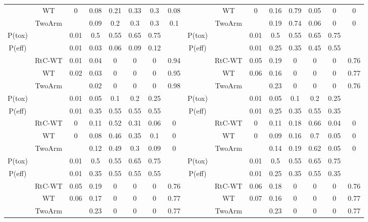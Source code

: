 \begin{table}
{\begin{tabular}[t]{ccccccc>{}c|cccccccc}
 			& WT & 0 & 0.08 & 0.21 & 0.33 & 0.3 & 0.08 &  & WT & 0 & 0.16 & 0.79 & 0.05 & 0 & 0\\
 			
 			\multirow{-3}{*}{\centering\arraybackslash 3} & TwoArm &  & 0.09 & 0.2 & 0.3 & 0.3 & 0.1 & \multirow{-3}{*}{\centering\arraybackslash 9} & TwoArm &  & 0.19 & 0.74 & 0.06 & 0 & 0\\
 			\cmidrule{1-16}
 			P(tox) &  & 0.01 & 0.5 & 0.55 & 0.65 & 0.75 &  & P(tox) &  & 0.01 & 0.5 & 0.55 & 0.65 & 0.75 \vphantom{1} & \\
 			\cmidrule{1-16}
 			P(eff) &  & 0.01 & 0.03 & 0.06 & 0.09 & 0.12 &  & P(eff) &  & 0.01 & 0.25 & 0.35 & 0.45 & 0.55 & \\
 			\cmidrule{1-16}
 			& RtC-WT & 0.01 & 0.04 & 0 & 0 & 0 & 0.94 &  & RtC-WT & 0.05 & 0.19 & 0 & 0 & 0 & 0.76\\
 			
 			& WT & 0.02 & 0.03 & 0 & 0 & 0 & 0.95 &  & WT & 0.06 & 0.16 & 0 & 0 & 0 & 0.77\\
 			
 			\multirow{-3}{*}{\centering\arraybackslash 4} & TwoArm &  & 0.02 & 0 & 0 & 0 & 0.98 & \multirow{-3}{*}{\centering\arraybackslash 10} & TwoArm &  & 0.23 & 0 & 0 & 0 & 0.76\\
 			\cmidrule{1-16}
 			P(tox) &  & 0.01 & 0.05 & 0.1 & 0.2 & 0.25 &  & P(tox) &  & 0.01 & 0.05 & 0.1 & 0.2 & 0.25 & \\
 			\cmidrule{1-16}
 			P(eff) &  & 0.01 & 0.35 & 0.55 & 0.55 & 0.55 &  & P(eff) &  & 0.01 & 0.25 & 0.35 & 0.55 & 0.35 \vphantom{1} & \\
 			\cmidrule{1-16}
 			& RtC-WT & 0 & 0.11 & 0.52 & 0.31 & 0.06 & 0 &  & RtC-WT & 0 & 0.11 & 0.18 & 0.66 & 0.04 & 0\\
 			
 			& WT & 0 & 0.08 & 0.46 & 0.35 & 0.1 & 0 &  & WT & 0 & 0.09 & 0.16 & 0.7 & 0.05 & 0\\
 			
 			\multirow{-3}{*}{\centering\arraybackslash 5} & TwoArm &  & 0.12 & 0.49 & 0.3 & 0.09 & 0 & \multirow{-3}{*}{\centering\arraybackslash 11} & TwoArm &  & 0.14 & 0.19 & 0.62 & 0.05 & 0\\
 			\cmidrule{1-16}
 			P(tox) &  & 0.01 & 0.5 & 0.55 & 0.65 & 0.75 &  & P(tox) &  & 0.01 & 0.5 & 0.55 & 0.65 & 0.75 & \\
 			\cmidrule{1-16}
 			P(eff) &  & 0.01 & 0.35 & 0.55 & 0.55 & 0.55 &  & P(eff) &  & 0.01 & 0.25 & 0.35 & 0.55 & 0.35 & \\
 			\cmidrule{1-16}
 			& RtC-WT & 0.05 & 0.19 & 0 & 0 & 0 & 0.76 &  & RtC-WT & 0.06 & 0.18 & 0 & 0 & 0 & 0.76\\
 			
 			& WT & 0.06 & 0.17 & 0 & 0 & 0 & 0.77 &  & WT & 0.07 & 0.16 & 0 & 0 & 0 & 0.77\\
 			
 			\multirow{-3}{*}{\centering\arraybackslash 6} & TwoArm &  & 0.23 & 0 & 0 & 0 & 0.77 & \multirow{-3}{*}{\centering\arraybackslash 12} & TwoArm &  & 0.23 & 0 & 0 & 0 & 0.77\\
 			\bottomrule
 	\end{tabular}}
 \end{table}

